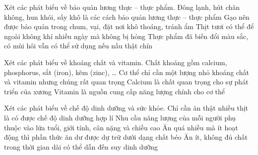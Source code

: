 \documentclass[Main.tex]{subfiles}
\begin{document}
\begin{ex}%
	Xét các phát biểu về bảo quản lương thực -- thực phẩm.
	\choiceTF
	{\True Đông lạnh, hút chân không, hun khói, sấy khô là các cách bảo quản lương thực -- thực phẩm}
	{\True Gạo nên được bảo quản trong chum, vại, đặt nơi khô thoáng, tránh ẩm}
	{Thịt tươi có thể để ngoài không khí nhiều ngày mà không bị hỏng}
	{Thực phẩm đã biến đổi màu sắc, có mùi hôi vẫn có thể sử dụng nếu nấu thật chín}
\end{ex}

\begin{ex}%
	Xét các phát biểu về khoáng chất và vitamin.
	\choiceTF
	{\True Chất khoáng gồm calcium, phosphorus, sắt (iron), kẽm (zinc), …}
	{\True Cơ thể chỉ cần một lượng nhỏ khoáng chất và vitamin nhưng chúng rất quan trọng}
	{\True Calcium là chất quan trọng cho sự phát triển của xương}
	{Vitamin là nguồn cung cấp năng lượng chính cho cơ thể}
\end{ex}

\begin{ex}%
	Xét các phát biểu về chế độ dinh dưỡng và sức khỏe.
	\choiceTF
	{Chỉ cần ăn thật nhiều thịt là có được chế độ dinh dưỡng hợp lí}
	{\True Nhu cầu năng lượng của mỗi người phụ thuộc vào lứa tuổi, giới tính, cân nặng và chiều cao}
	{\True Ăn quá nhiều mà ít hoạt động thì phần thức ăn dư được dự trữ dưới dạng chất béo}
	{\True Ăn ít, không đủ chất trong thời gian dài có thể dẫn đến suy dinh dưỡng}
\end{ex}
\end{document}
